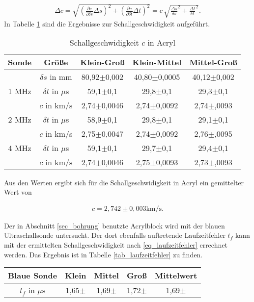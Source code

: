\begin{align}
 \Delta c = \sqrt{\left(\frac{\partial c}{\partial \delta s} \Delta s \right)^2 + \left(\frac{\partial c}{\partial \delta t} \Delta t \right)^2} = c\, \sqrt{\frac{\Delta s}{\delta s}^2 + \frac{\Delta t}{\delta t}^2}.
\end{align}
In Tabelle \ref{tab_schall} sind die Ergebnisse zur Schallgeschwidigkeit aufgeführt. 
\renewcommand{\arraystretch}{1.5}
\begin{table}[H]
 \begin{tabular}{c|c|c|c|c}
Sonde & Größe & Klein-Groß & Klein-Mittel & Mittel-Groß\\
\hline
&$\delta s$ in mm	&	80,92$\pm$0,002&	40,80$\pm$0,0005&	40,12$\pm$0,002\\
\hline
\hline
1 MHz &$\delta t$ in $\mu$s &59,1$\pm$0,1&	29,8$\pm$0,1&	29,3$\pm$0,1\\
&$c$ in km/s		&2,74$\pm$0,0046&	2,74$\pm$0,0092	&	2,74$\pm$,0093\\
\hline
2 MHz &$\delta t$ in $\mu$s &	58,9$\pm$0,1&	29,8$\pm$0,1&	29,1$\pm$0,1\\
&$c$ in km/s		&2,75$\pm$0,0047&	2,74$\pm$0,0092	&	2,76$\pm$,0095\\
\hline
4 MHz &$\delta t$ in $\mu$s &	59,1$\pm$0,1&	29,7$\pm$0,1&	29,4$\pm$0,1\\
&$c$ in km/s		&2,74$\pm$0,0046&	2,75$\pm$0,0093&	2,73$\pm$,0093\\
 \end{tabular}
\caption{Schallgeschwidigkeit $c$ in Acryl}
\label{tab_schall}
\end{table}
\renewcommand{\arraystretch}{1.0}
Aus den Werten ergibt sich für die Schallgeschwidigkeit in Acryl ein gemittelter Wert von

\begin{align}
 c = 2,742\pm0,003 \text{km/s}.
\end{align}

Der in Abschnitt \ref{sec_bohrung} benutzte Acrylblock wird mit der blauen Ultraschallsonde untersucht. Der dort ebenfalls auftretende
Laufzeitfehler $t_f$ kann mit der ermittelten Schallgeschwidigkeit nach \eqref{eq_laufzeitfehler} errechnet werden. Das Ergebnis
ist in Tabelle \ref{tab_laufzeitfehler} zu finden.

\begin{table}[H]
 \begin{tabular}{c|c|c|c|c}
Blaue Sonde & Klein & Mittel & Groß & Mittelwert\\
 \hline
  $t_f$ in $\mu$s &1,65$\pm$	&1,69$\pm$	&1,72$\pm$ & 1,69$\pm$ \\
 \end{tabular}

\end{table}



